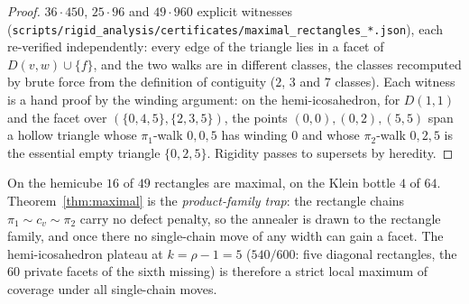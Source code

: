 \documentclass[12pt]{article}
\begin{document}
\begin{proof}
$36\cdot450$, $25\cdot96$ and $49\cdot960$ explicit witnesses
(\texttt{scripts/rigid\_analysis/}\allowbreak\texttt{certificates/}\allowbreak\texttt{maximal\_rectangles\_*.json}),
each re-verified independently: every edge of the triangle lies in a facet of
$D(v,w)\cup\{f\}$, and the two walks are in different classes, the classes
recomputed by brute force from the definition of contiguity ($2$, $3$ and $7$
classes).  Each witness is a hand proof by the winding argument: on the
hemi-icosahedron, for $D(1,1)$ and the facet over $(\{0,4,5\},\{2,3,5\})$,
the points $(0,0),(0,2),(5,5)$ span a hollow triangle whose $\pi_1$-walk
$0,0,5$ has winding $0$ and whose $\pi_2$-walk $0,2,5$ is the essential empty
triangle $\{0,2,5\}$.  Rigidity passes to supersets by heredity.
\end{proof}

On the hemicube $16$ of $49$ rectangles are maximal, on the Klein bottle $4$
of $64$.  Theorem~\ref{thm:maximal} is the \emph{product-family trap}: the
rectangle chains $\pi_1\sim c_v\sim\pi_2$ carry no defect penalty, so the
annealer is drawn to the rectangle family, and once there no single-chain
move of any width can gain a facet.  The hemi-icosahedron plateau at
$k=\rho-1=5$ ($540/600$: five diagonal rectangles, the $60$ private facets of
the sixth missing) is therefore a strict local maximum of coverage under all
single-chain moves.
\end{document}
